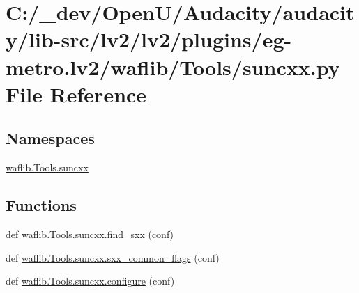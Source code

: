 \hypertarget{lv2_2plugins_2eg-metro_8lv2_2waflib_2_tools_2suncxx_8py}{}\section{C\+:/\+\_\+dev/\+Open\+U/\+Audacity/audacity/lib-\/src/lv2/lv2/plugins/eg-\/metro.lv2/waflib/\+Tools/suncxx.py File Reference}
\label{lv2_2plugins_2eg-metro_8lv2_2waflib_2_tools_2suncxx_8py}
\subsection*{Namespaces}
\begin{DoxyCompactItemize}
\item 
 \hyperlink{namespacewaflib_1_1_tools_1_1suncxx}{waflib.\+Tools.\+suncxx}
\end{DoxyCompactItemize}
\subsection*{Functions}
\begin{DoxyCompactItemize}
\item 
def \hyperlink{namespacewaflib_1_1_tools_1_1suncxx_a88c1361f04aec9dca5a65944c5c06cb9}{waflib.\+Tools.\+suncxx.\+find\+\_\+sxx} (conf)
\item 
def \hyperlink{namespacewaflib_1_1_tools_1_1suncxx_abf9e33c219f7edbbb25eb5360ecf7089}{waflib.\+Tools.\+suncxx.\+sxx\+\_\+common\+\_\+flags} (conf)
\item 
def \hyperlink{namespacewaflib_1_1_tools_1_1suncxx_a07c4b17184f93e69ac10e64f97a20ace}{waflib.\+Tools.\+suncxx.\+configure} (conf)
\end{DoxyCompactItemize}

